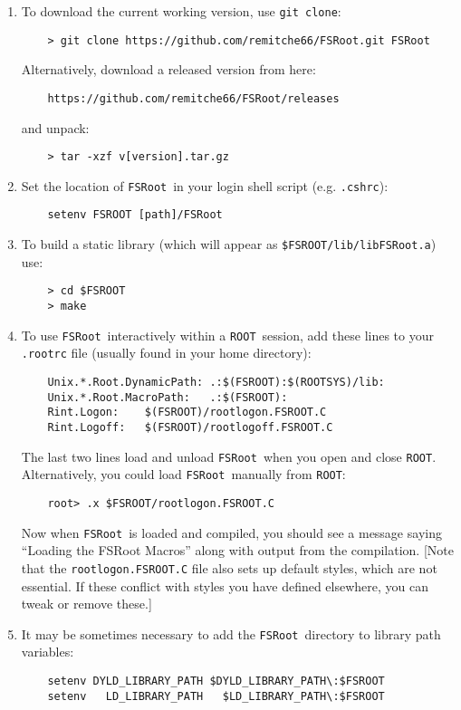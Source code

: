 \documentclass[11pt]{article}
\newcommand{\FSR}{{\tt FSRoot}}
\newcommand{\ROOT}{{\tt ROOT}}
\begin{document}
\begin{enumerate}

\item To download the current working version, use {\tt git clone}:
\begin{verbatim}
    > git clone https://github.com/remitche66/FSRoot.git FSRoot
\end{verbatim}
Alternatively, download a released version from here:
\begin{verbatim}
    https://github.com/remitche66/FSRoot/releases
\end{verbatim}
and unpack:
\begin{verbatim}
    > tar -xzf v[version].tar.gz
\end{verbatim}


\item Set the location of \FSR\ in your login shell script (e.g. {\tt .cshrc}):
\begin{verbatim}
    setenv FSROOT [path]/FSRoot
\end{verbatim}

\item To build a static library (which will appear as {\tt \$FSROOT/lib/libFSRoot.a}) use:
\begin{verbatim}
    > cd $FSROOT
    > make
\end{verbatim}

\item To use \FSR\ interactively within a \ROOT\ session, add these lines to your {\tt .rootrc} file (usually found in your home directory):
\begin{verbatim}
    Unix.*.Root.DynamicPath: .:$(FSROOT):$(ROOTSYS)/lib:
    Unix.*.Root.MacroPath:   .:$(FSROOT):
    Rint.Logon:    $(FSROOT)/rootlogon.FSROOT.C
    Rint.Logoff:   $(FSROOT)/rootlogoff.FSROOT.C
\end{verbatim}
The last two lines load and unload \FSR\ when you open and close \ROOT.
Alternatively, you could load \FSR\ manually from \ROOT:
\begin{verbatim}
    root> .x $FSROOT/rootlogon.FSROOT.C
\end{verbatim}
Now when \FSR\ is loaded and compiled, you should see a message saying ``Loading the FSRoot Macros'' along with output from the compilation.  [Note that the {\tt rootlogon.FSROOT.C} file also sets up default styles, which are not essential.  If these conflict with styles you have defined elsewhere, you can tweak or remove these.]

\item It may be sometimes necessary to add the \FSR\ directory to library path variables:
\begin{verbatim}
    setenv DYLD_LIBRARY_PATH $DYLD_LIBRARY_PATH\:$FSROOT
    setenv   LD_LIBRARY_PATH   $LD_LIBRARY_PATH\:$FSROOT
\end{verbatim}

\end{enumerate}
\end{document}
